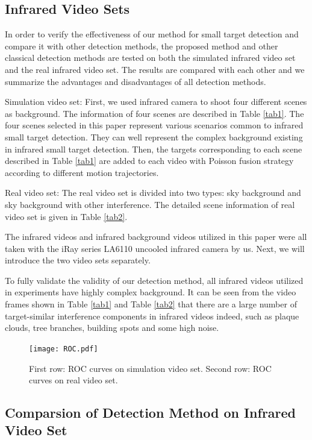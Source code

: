 \documentclass[journal]{IEEEtran}
\begin{document}
\subsection{Infrared Video Sets}
In order to verify the effectiveness of our method for small target detection and compare it with other detection methods, the proposed method and other classical detection methods are tested on both the simulated infrared video set and the real infrared video set. The results are compared with each other and we summarize the advantages and disadvantages of all detection methods.

Simulation video set: First, we used infrared camera to shoot four different scenes as background. The information of four scenes are described in Table \ref{tab1}. The four scenes selected in this paper represent various scenarios common to infrared small target detection. They can well represent the complex background existing in infrared small target detection. Then, the targets corresponding to each scene described in Table \ref{tab1} are added to each video with Poisson fusion strategy\cite{perez2003poisson} according to different motion trajectories.

Real video set: The real video set is divided into two types: sky background and sky background with other interference. The detailed scene information of real video set is given in Table \ref{tab2}.

The infrared videos and infrared background videos utilized in this paper were all taken with the iRay series LA6110 uncooled infrared camera by us. Next, we will introduce the two video sets separately.

To fully validate the validity of our detection method, all infrared videos utilized in experiments have highly complex background. It can be seen from the video frames shown in Table \ref{tab1} and Table \ref{tab2} that there are a large number of target-similar interference components in infrared videos indeed, such as plaque clouds, tree branches, building spots and some high noise.
\begin{figure}[htb]
  \centering
  \texttt{[image: ROC.pdf]}
  \caption{First row: ROC curves on simulation video set. Second row: ROC curves on real video set.}
  \label{ROC}
\end{figure}

\subsection{Comparsion of Detection Method on Infrared Video Set}
\end{document}
